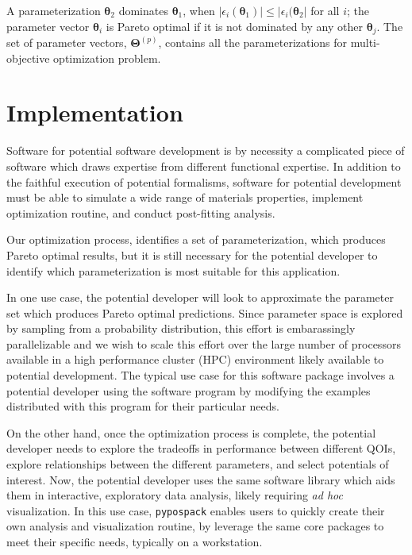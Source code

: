 A parameterization $\bm{\theta}_2$ dominates $\bm{\theta}_1$, 
when $\lvert \epsilon_i(\bm{\theta}_1) \rvert \leq  \lvert \epsilon_i(\bm{\theta}_2 \rvert$ for all $i$; the parameter vector $\bm{\theta}_i$ is Pareto optimal if it is not dominated by any other $\bm{\theta}_j$.  The set of parameter vectors, $\bm{\Theta}^{(p)}$, contains all the parameterizations for multi-objective optimization problem.
\section{Implementation}

Software for potential software development is by necessity a complicated piece of software which draws expertise from different functional expertise.  
In addition to the faithful execution of potential formalisms, software for potential development must be able to simulate a wide range of materials properties, implement optimization routine, and conduct post-fitting analysis.

Our optimization process, identifies a set of parameterization, which produces Pareto optimal results, but it is still necessary for the potential developer to identify which parameterization is most suitable for this application.

In one use case, the potential developer will look to approximate the parameter set which produces Pareto optimal predictions.  Since parameter space is explored by sampling from a probability distribution, this effort is embarassingly parallelizable and we wish to scale this effort over the large number of processors available in a high performance cluster (HPC) environment likely available to potential development.  The typical use case for this software package involves a potential developer using the software program by modifying the examples distributed with this program for their particular needs.

On the other hand, once the optimization process is complete, the potential developer needs to explore the tradeoffs in performance between different QOIs, explore relationships between the different parameters, and select potentials of interest.  
Now, the potential developer uses the same software library which aids them in interactive, exploratory data analysis, likely requiring \emph{ad hoc} visualization.  
In this use case, \verb|pypospack| enables users to quickly create their own analysis and visualization routine, by leverage the same core packages to meet their specific needs, typically on a workstation.

